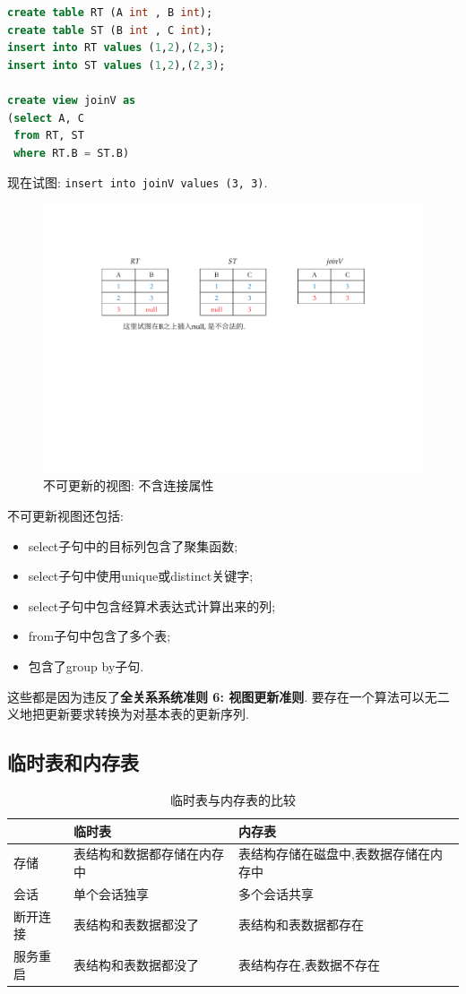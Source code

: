 \begin{lstlisting}[language=SQL]
create table RT (A int , B int);
create table ST (B int , C int);
insert into RT values (1,2),(2,3);
insert into ST values (1,2),(2,3);

create view joinV as
(select A, C
 from RT, ST
 where RT.B = ST.B)
\end{lstlisting}

现在试图: \verb|insert into joinV values (3, 3)|.

\begin{figure}[H]
    \centering
    \includegraphics[width=.8\textwidth]{figure/不合法的视图更新.pdf}
    \caption{不可更新的视图: 不含连接属性}
\end{figure}

不可更新视图还包括:
\begin{itemize}
  \item select子句中的目标列包含了聚集函数;
  \item select子句中使用unique或distinct关键字;
  \item select子句中包含经算术表达式计算出来的列;
  \item from子句中包含了多个表;
  \item 包含了group by子句.
\end{itemize}

这些都是因为违反了\textbf{全关系系统准则 6: 视图更新准则}. 要存在一个算法可以无二
义地把更新要求转换为对基本表的更新序列.

\subsection{临时表和内存表}

\begin{table}[H]
\centering
\begin{tabular}{|l|l|l|}
\hline
 & 临时表 & 内存表 \\
\hline
存储 & 表结构和数据都存储在内存中 & 表结构存储在磁盘中,表数据存储在内存中 \\
\hline
会话 & 单个会话独享 & 多个会话共享 \\
\hline
断开连接 & 表结构和表数据都没了 & 表结构和表数据都存在 \\
\hline
服务重启 & 表结构和表数据都没了 & 表结构存在,表数据不存在 \\
\hline
\end{tabular}
\caption{临时表与内存表的比较}
\end{table}


